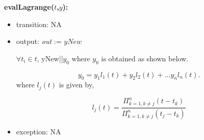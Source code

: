 \documentclass[12pt, titlepage]{article}
\begin{document}
\noindent \textbf{evalLagrange($t$,$y$):}
\begin{itemize}
	\item transition: NA
	
	\item output:  \textit{out} := $yNew$
	
	$\forall t_i \in t$, yNew||$y_0$ where $y_0$ is obtained as shown 
	below.
	
	\begin{equation*}
	y_0 = y_1 l_1 (t) + y_2 l_2(t) + \dots y_n l_n (t).
	\end{equation*}
	where $l_j (t)$ is given by,
	
	
	\begin{equation*}
	l_j (t) =  \frac{ \Pi _{k=1, k\neq j} ^n (t - t_k)} {\Pi _{k=1,k \neq j} ^n 
		(t_j - t_k)}
	\end{equation*}
	\item exception: NA
\end{itemize}


~\newline
~\newline
\end{document}

